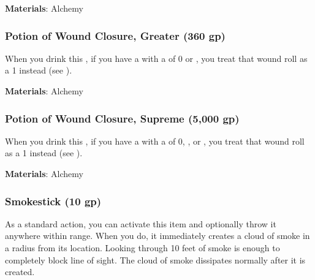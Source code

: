 \vspace{0.25em}
\textbf{Materials}: Alchemy


\lowercase{\hypertarget{item:Potion of Wound Closure, Greater}{}}\label{item:Potion of Wound Closure, Greater}
\hypertarget{item:Potion of Wound Closure, Greater}{\subsubsection{Potion of Wound Closure, Greater\hfill{} (360 gp)}}

When you drink this , if you have a  with a  of 0 or , you treat that wound roll as a 1 instead (see ).



\vspace{0.25em}
\textbf{Materials}: Alchemy


\lowercase{\hypertarget{item:Potion of Wound Closure, Supreme}{}}\label{item:Potion of Wound Closure, Supreme}
\hypertarget{item:Potion of Wound Closure, Supreme}{\subsubsection{Potion of Wound Closure, Supreme\hfill{} (5,000 gp)}}

When you drink this , if you have a  with a  of 0, , or , you treat that wound roll as a 1 instead (see ).



\vspace{0.25em}
\textbf{Materials}: Alchemy


\lowercase{\hypertarget{item:Smokestick}{}}\label{item:Smokestick}
\hypertarget{item:Smokestick}{\subsubsection{Smokestick\hfill{} (10 gp)}}

As a standard action, you can activate this item and optionally throw it anywhere within \rngclose range.
When you do, it immediately creates a cloud of smoke in a \areasmall radius from its location.
Looking through 10 feet of smoke is enough to completely block line of sight.
The cloud of smoke dissipates normally after it is created.



